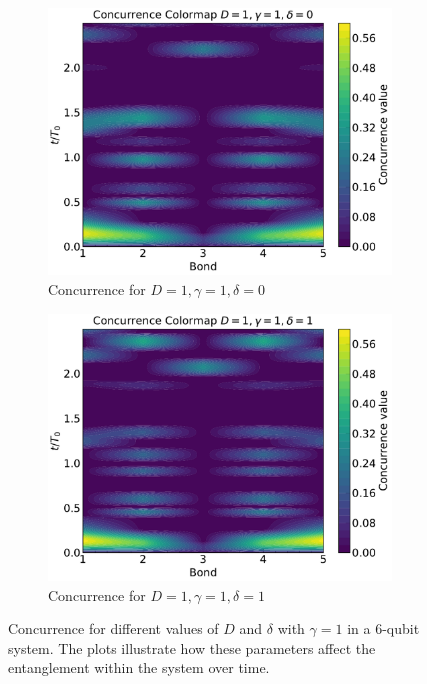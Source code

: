 \begin{figure}[h!]
    \vspace{0.5cm}

    \begin{subfigure}[b]{0.48\textwidth}
        \centering
        \includegraphics[width=\linewidth]{results_and_discussion/6_qubits/up_down_with_ana_1_1_0.pdf}
        \caption{Concurrence for \( D = 1, \gamma = 1, \delta = 0 \)}
        \label{fig:6q_1_1_0}
    \end{subfigure}
    \hfill
    \begin{subfigure}[b]{0.48\textwidth}
        \centering
        \includegraphics[width=\linewidth]{results_and_discussion/6_qubits/up_down_with_ana_1_1_1.pdf}
        \caption{Concurrence for \( D = 1, \gamma = 1, \delta = 1 \)}
        \label{fig:6q_1_1_1}
    \end{subfigure}

    \caption{Concurrence for different values of \( D \) and \( \delta \) with \( \gamma = 1 \) in a 6-qubit system. The plots illustrate how these parameters affect the entanglement within the system over time.}
    \label{fig:concurrence_comparison_6qubits}
\end{figure}

